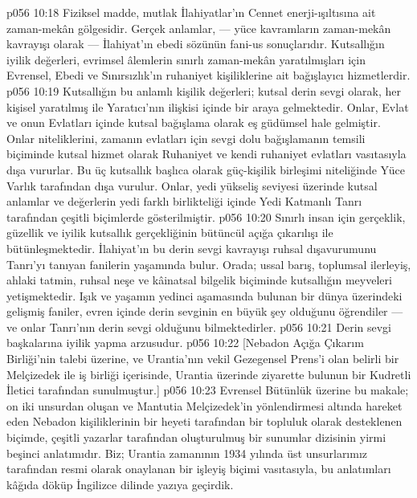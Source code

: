 \vs p056 10:18 Fiziksel madde, mutlak İlahiyatlar’ın Cennet enerji\hyp{}ışıltısına ait zaman\hyp{}mekân gölgesidir. Gerçek anlamlar, --- yüce kavramların zaman\hyp{}mekân kavrayışı olarak --- İlahiyat’ın ebedi sözünün fani\hyp{}us sonuçlarıdır. Kutsallığın iyilik değerleri, evrimsel âlemlerin sınırlı zaman\hyp{}mekân yaratılmışları için Evrensel, Ebedi ve Sınırsızlık’ın ruhaniyet kişiliklerine ait bağışlayıcı hizmetlerdir.
\vs p056 10:19 Kutsallığın bu anlamlı kişilik değerleri; kutsal derin sevgi olarak, her kişisel yaratılmış ile Yaratıcı’nın ilişkisi içinde bir araya gelmektedir. Onlar, Evlat ve onun Evlatları içinde kutsal bağışlama olarak eş güdümsel hale gelmiştir. Onlar niteliklerini, zamanın evlatları için sevgi dolu bağışlamanın temsili biçiminde kutsal hizmet olarak Ruhaniyet ve kendi ruhaniyet evlatları vasıtasıyla dışa vururlar. Bu üç kutsallık başlıca olarak güç\hyp{}kişilik birleşimi niteliğinde Yüce Varlık tarafından dışa vurulur. Onlar, yedi yükseliş seviyesi üzerinde kutsal anlamlar ve değerlerin yedi farklı birlikteliği içinde Yedi Katmanlı Tanrı tarafından çeşitli biçimlerde gösterilmiştir.
\vs p056 10:20 Sınırlı insan için gerçeklik, güzellik ve iyilik kutsallık gerçekliğinin bütüncül açığa çıkarılışı ile bütünleşmektedir. İlahiyat’ın bu derin sevgi kavrayışı ruhsal dışavurumunu Tanrı’yı tanıyan fanilerin yaşamında bulur. Orada; ussal barış, toplumsal ilerleyiş, ahlaki tatmin, ruhsal neşe ve kâinatsal bilgelik biçiminde kutsallığın meyveleri yetişmektedir. Işık ve yaşamın yedinci aşamasında bulunan bir dünya üzerindeki gelişmiş faniler, evren içinde derin sevginin en büyük şey olduğunu öğrendiler --- ve onlar Tanrı’nın derin sevgi olduğunu bilmektedirler.
\vs p056 10:21 Derin sevgi başkalarına iyilik yapma arzusudur.
\vs p056 10:22 [Nebadon Açığa Çıkarım Birliği’nin talebi üzerine, ve Urantia’nın vekil Gezegensel Prens’i olan belirli bir Melçizedek ile iş birliği içerisinde, Urantia üzerinde ziyarette bulunun bir Kudretli İletici tarafından sunulmuştur.]
\separatorline
\vs p056 10:23 Evrensel Bütünlük üzerine bu makale; on iki unsurdan oluşan ve Mantutia Melçizedek’in yönlendirmesi altında hareket eden Nebadon kişiliklerinin bir heyeti tarafından bir topluluk olarak desteklenen biçimde, çeşitli yazarlar tarafından oluşturulmuş bir sunumlar dizisinin yirmi beşinci anlatımıdır. Biz; Urantia zamanının 1934 yılında üst unsurlarımız tarafından resmi olarak onaylanan bir işleyiş biçimi vasıtasıyla, bu anlatımları kâğıda döküp İngilizce dilinde yazıya geçirdik.

